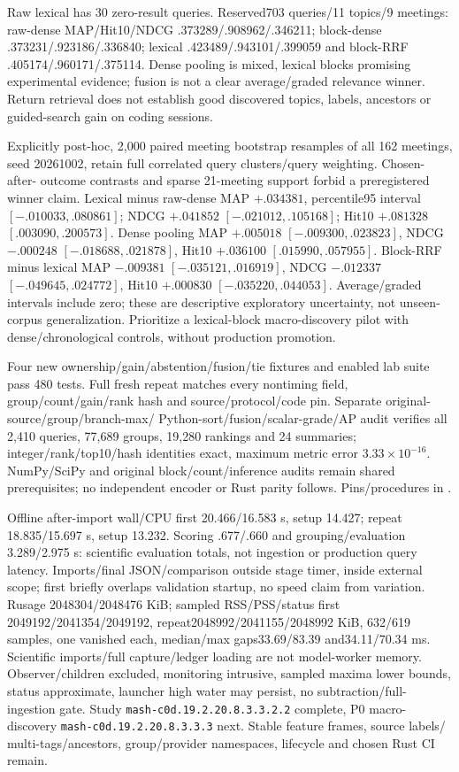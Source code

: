\documentclass[11pt]{article}
\begin{document}
Raw lexical has 30 zero-result queries. Reserved703 queries/11 topics/9 meetings:
raw-dense MAP/Hit10/NDCG .373289/.908962/.346211; block-dense
.373231/.923186/.336840; lexical .423489/.943101/.399059 and block-RRF
.405174/.960171/.375114. Dense pooling is mixed, lexical blocks promising
experimental evidence; fusion is not a clear average/graded relevance winner.
Return retrieval does not establish good discovered topics, labels, ancestors or
guided-search gain on coding sessions.

Explicitly post-hoc, 2,000 paired meeting bootstrap resamples of all 162 meetings,
seed 20261002, retain full correlated query clusters/query weighting. Chosen-after-
outcome contrasts and sparse 21-meeting support forbid a preregistered winner
claim. Lexical minus raw-dense MAP $+.034381$, percentile95 interval
$[-.010033,.080861]$; NDCG $+.041852$ $[-.021012,.105168]$;
Hit10 $+.081328$ $[.003090,.200573]$. Dense pooling MAP $+.005018$
$[-.009300,.023823]$, NDCG $-.000248$ $[-.018688,.021878]$,
Hit10 $+.036100$ $[.015990,.057955]$. Block-RRF minus lexical MAP
$-.009381$ $[-.035121,.016919]$, NDCG $-.012337$ $[-.049645,.024772]$,
Hit10 $+.000830$ $[-.035220,.044053]$. Average/graded intervals include zero;
these are descriptive exploratory uncertainty, not unseen-corpus generalization.
Prioritize a lexical-block macro-discovery pilot with dense/chronological controls,
without production promotion.

Four new ownership/gain/abstention/fusion/tie fixtures and enabled lab suite pass
480 tests. Full fresh repeat matches every nontiming field, group/count/gain/rank
hash and source/protocol/code pin. Separate original-source/group/branch-max/
Python-sort/fusion/scalar-grade/AP audit verifies all 2,410 queries, 77,689 groups,
19,280 rankings and 24 summaries; integer/rank/top10/hash identities exact, maximum
metric error $3.33\times10^{-16}$. NumPy/SciPy and original block/count/inference
audits remain shared prerequisites; no independent encoder or Rust parity follows.
Pins/procedures in .

Offline after-import wall/CPU first 20.466/16.583 s, setup 14.427; repeat
18.835/15.697 s, setup 13.232. Scoring .677/.660 and grouping/evaluation
3.289/2.975 s: scientific evaluation totals, not ingestion or production query
latency. Imports/final JSON/comparison outside stage timer, inside external scope;
first briefly overlaps validation startup, no speed claim from variation.
Rusage 2048304/2048476 KiB; sampled RSS/PSS/status first
2049192/2041354/2049192, repeat2048992/2041155/2048992 KiB,
632/619 samples, one vanished each, median/max gaps33.69/83.39 and34.11/70.34 ms.
Scientific imports/full capture/ledger loading are not model-worker memory.
Observer/children excluded, monitoring intrusive, sampled maxima lower bounds,
status approximate, launcher high water may persist, no subtraction/full-ingestion
gate. Study \texttt{mash-c0d.19.2.20.8.3.3.2.2} complete, P0 macro-discovery
\texttt{mash-c0d.19.2.20.8.3.3.3} next. Stable feature frames, source labels/
multi-tags/ancestors, group/provider namespaces, lifecycle and chosen Rust CI remain.
\end{document}
